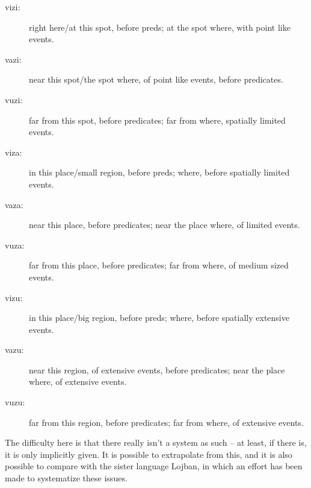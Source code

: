 \documentclass[12pt]{book}
\begin{document}
\begin{description}

\item[vizi:]  right here/at this spot, before preds; at the spot where, with point like events.

\item[vazi:]  near this spot/the spot where, of point like events, before predicates.

\item[vuzi:]   far from this spot, before predicates; far from where, spatially limited events.

\item[viza:]  in this place/small region, before preds; where, before spatially limited events.

\item[vaza:]  near this place, before predicates; near the place where, of limited events.

\item[vuza:]  far from this place, before predicates; far from where, of medium sized events.

\item[vizu:]  in this place/big region, before preds; where, before spatially extensive events.

\item[vazu:]  near this region, of extensive events, before predicates;  near the place where, of extensive events.

\item[vuzu:]  far from this region, before predicates;  far from where, of extensive events.



\end{description}



The difficulty here is that there really isn't a system as such -- at least, if there is, it is only implicitly given.  It is possible to extrapolate from this, and it is also possible to compare with the sister language Lojban, in which an effort has been made to systematize these issues.
\end{document}
